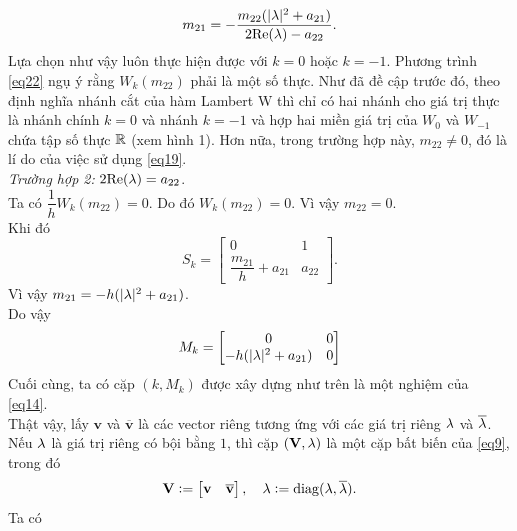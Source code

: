 \begin{equation}\label{eq23}
	m_{21} = -\dfrac{m_{22}(\vert \lambda \vert ^2 +a_{21})}{2\mathrm{Re}(\lambda)-a_{22}}.
\end{equation}
Lựa chọn như vậy luôn thực hiện được với $k = 0$ hoặc $k = -1$. Phương trình \eqref{eq22} ngụ ý rằng $W_k(m_{22})$ phải là một số thực. Như đã đề cập trước đó, theo định nghĩa nhánh cắt của hàm Lambert W thì chỉ có hai nhánh cho giá trị thực là nhánh chính $k = 0$ và nhánh $k = -1$ và hợp hai miền giá trị của $W_0$ và $W_{-1}$ chứa tập số thực $\mathbb{R}$ (xem hình 1). Hơn nữa, trong trường hợp này, $m_{22} \ne 0$, đó là lí do của việc sử dụng \eqref{eq19}.\\
%
\noindent\textit{Trường hợp 2:} $2\mathrm{Re}(\lambda) = a_{22}$.\\
Ta có $\dfrac{1}{h } W_k(m_{22}) = 0$. Do đó $W_k(m_{22}) =0$. Vì vậy $m_{22}=0$.\\
Khi đó
\begin{equation*}
S_k = \begin{bmatrix}
	0 &1\\
	\dfrac{m_{21}}{h } +a_{21} & a_{22}
\end{bmatrix}.
\end{equation*}
Vì vậy $m_{21} = - h (\vert \lambda \vert ^2 + a_{21})$.\\
Do vậy
\begin{equation}\label{eq24}
	M_k = \begin{bmatrix}
		0 &0\\
		- h (\vert \lambda \vert ^2 + a_{21}) & 0
	\end{bmatrix}
\end{equation} 
Cuối cùng, ta có cặp $(k, M_k)$ được xây dựng như trên là một nghiệm của \eqref{eq14}.\\
Thật vậy, lấy $\mathbf{v}$ và  $\mathbf{\overline{v}}$ là các vector riêng tương ứng với các giá trị riêng $\lambda$ và $\overline{\lambda}$. Nếu $\lambda$ là giá trị riêng có bội bằng $1$, thì cặp $(\mathbf{V}, \mathbf{\lambda})$ là một cặp bất biến của \eqref{eq9}, trong đó
\begin{equation}\label{eq25}
	\mathbf{V} := \begin{bmatrix}
		\mathbf{v} &\mathbf{\overline{v}}
	\end{bmatrix},
	\quad 
	\mathbf{\lambda} := \mathrm{diag} (\lambda, \overline{\lambda}).
\end{equation}
Ta có

